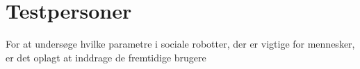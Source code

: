 \section{Testpersoner}
\label{ParametreTestpersoner}
%
For at undersøge hvilke parametre i sociale robotter, der er vigtige for mennesker, er det oplagt at inddrage de fremtidige brugere